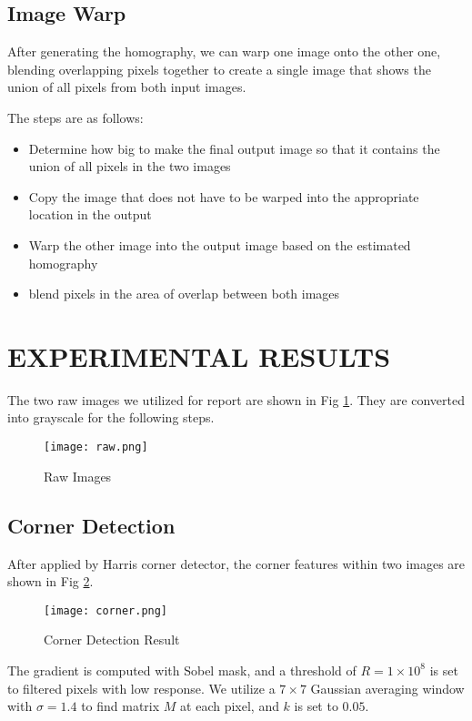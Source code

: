 \documentclass[letterpaper, 10 pt, conference]{ieeeconf}
\begin{document}
\subsection{Image Warp}
After generating the homography, we can warp one image onto the other one, blending overlapping pixels together to create a single image that shows the union of all pixels from both input images. 

The steps are as follows:
\begin{itemize}
    \item Determine how big to make the final output image so that it contains the union of all pixels in the two images
    \item Copy the image that does not have to be warped into the appropriate location in the output
    \item Warp the other image into the output image based on the estimated homography
    \item blend pixels in the area of overlap between both images
\end{itemize}
\section{EXPERIMENTAL RESULTS}
The two raw images we utilized for report are shown in Fig \ref{raw}. They are converted into grayscale for the following steps.
\begin{figure}[thpb]
\centering
\texttt{[image: raw.png]}
\caption{Raw Images}
\label{raw}
\end{figure}
\subsection{Corner Detection}
After applied by Harris corner detector, the corner features within two images are shown in Fig \ref{corner}.

\begin{figure}[thpb]
\centering
\texttt{[image: corner.png]}
\caption{Corner Detection Result}
\label{corner}
\end{figure}

The gradient is computed with Sobel mask, and a threshold of $R = 1\times 10^8$ is set to filtered pixels with low response. We utilize a $7\times7$ Gaussian averaging window with $\sigma=1.4$ to find matrix $M$ at each pixel, and $k$ is set to $0.05$.
\end{document}
